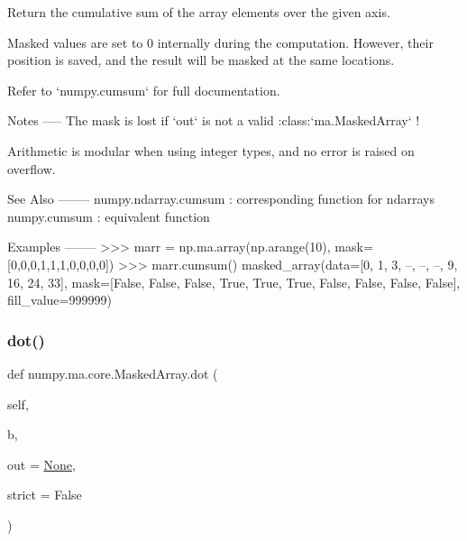 \begin{DoxyVerb}Return the cumulative sum of the array elements over the given axis.

Masked values are set to 0 internally during the computation.
However, their position is saved, and the result will be masked at
the same locations.

Refer to `numpy.cumsum` for full documentation.

Notes
-----
The mask is lost if `out` is not a valid :class:`ma.MaskedArray` !

Arithmetic is modular when using integer types, and no error is
raised on overflow.

See Also
--------
numpy.ndarray.cumsum : corresponding function for ndarrays
numpy.cumsum : equivalent function

Examples
--------
>>> marr = np.ma.array(np.arange(10), mask=[0,0,0,1,1,1,0,0,0,0])
>>> marr.cumsum()
masked_array(data=[0, 1, 3, --, --, --, 9, 16, 24, 33],
     mask=[False, False, False,  True,  True,  True, False, False,
           False, False],
       fill_value=999999)\end{DoxyVerb}
 \mbox{\label{classnumpy_1_1ma_1_1core_1_1MaskedArray_a721df29c0390812be809cb70d481dc99}} 
\subsubsection{\texorpdfstring{dot()}{dot()}}
{\footnotesize\ttfamily def numpy.\+ma.\+core.\+Masked\+Array.\+dot (\begin{DoxyParamCaption}\item[{}]{self,  }\item[{}]{b,  }\item[{}]{out = {\ttfamily \hyperlink{namespacenumpy_1_1ma_1_1core_a647ee1848dfa3692fe35a663a2aa40b3}{None}},  }\item[{}]{strict = {\ttfamily False} }\end{DoxyParamCaption})}

